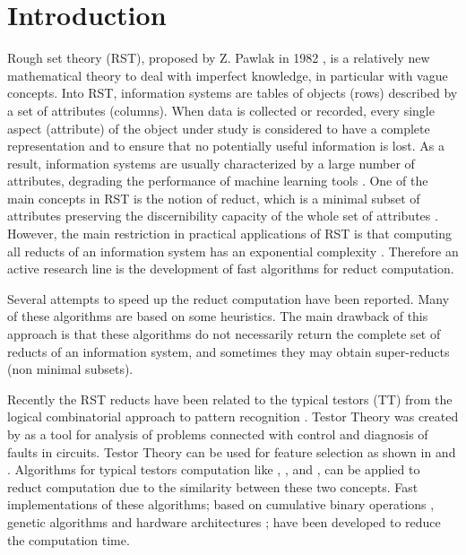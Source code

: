 \documentclass[authoryear,11pt]{elsarticle}
\begin{document}
\section{Introduction}
  Rough set theory (RST), proposed by Z. Pawlak in 1982 \citep{Pawlak81,Pawlak81-2,Pawlak82,Pawlak91}, 
  is a relatively new mathematical theory to deal with imperfect knowledge, in particular with vague 
  concepts. Into RST, information systems are tables of objects (rows) described by a set of attributes (columns). 
  When data is collected or recorded, every single aspect (attribute) of the object under study is considered 
  to have a complete representation and to ensure that no potentially useful information is lost.
  As a result, information systems are usually characterized by a large number of attributes,
  degrading the performance of machine learning tools \citep{Parthalain08}.
  One of the main concepts in RST is the notion of reduct, which is a minimal subset of attributes 
  preserving the discernibility capacity of the whole set of attributes \citep{Pawlak91}.  
  However, the main restriction in practical applications of RST is that computing all reducts of an information 
  system has an exponential complexity \citep{Skowron92}. Therefore an active research line is the development 
  of fast algorithms for reduct computation.
  
  Several attempts to speed up the reduct computation have been reported. Many of these algorithms are 
  based on some heuristics. The main drawback of this approach is that these algorithms do not necessarily 
  return the complete set of reducts of an information system, and sometimes they may obtain super-reducts 
  (non minimal subsets). 
  
  Recently the RST reducts have been related to the typical testors (TT) from the logical combinatorial approach 
  to pattern recognition \citep{Lazo15}. Testor Theory was created by \cite{Cheguis55} as a tool for analysis of 
  problems connected with control and diagnosis of faults in circuits. 
  Testor Theory can be used for feature selection as shown in \citep{Ruiz08} and \citep{Martinez01}. Algorithms for
  typical testors computation like \citep{Ruiz85}, \citep{Santiesteban03}, \citep{Sanchez07} 
  and \citep{Lias09}, can be applied to reduct computation due to the similarity between these two concepts. 
  Fast implementations of these algorithms; based on cumulative binary operations \citep{Sanchez10}, genetic 
  algorithms \citep{Sanchez99} and hardware architectures \citep{Rojas12}; have been developed to reduce the
  computation time.   
\end{document}

